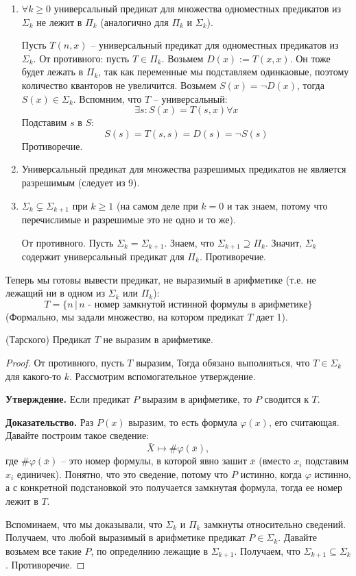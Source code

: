 \begin{enumerate}
    \item $\forall k \geqslant 0$ универсальный предикат для множества одноместных предикатов из $\Sigma_k$ не лежит в $\Pi_k$ (аналогично для $\Pi_k$ и $\Sigma_k$).
    
    Пусть $T(n, x)$ -- универсальный предикат для одноместных предикатов из $\Sigma_k$. От противного: пусть $T \in \Pi_k$. Возьмем $D(x) := T(x, x)$. Он тоже будет лежать в $\Pi_k$, так как переменные мы подставляем одинкаовые, поэтому количество кванторов не увеличится. Возьмем $S(x) = \lnot D(x)$, тогда $S(x) \in \Sigma_k$. Вспомним, что $T$ -- универсальный: \[ \exists s : S(x) = T(s, x) \forall x \]
    Подставим $s$ в $S$: \[ S(s) = T(s, s) = D(s) = \lnot S(s) \]
    Противоречие.

    \item Универсальный предикат для множества разрешимых предикатов не является разрешимым (следует из 9).
    \item $\Sigma_k \subsetneq \Sigma_{k+1}$ при $k \geqslant 1$ (на самом деле при $k = 0$ и так знаем, потому что перечислимые и разрешимые это не одно и то же).
    
    От противного. Пусть $\Sigma_k = \Sigma_{k+1}$. Знаем, что $\Sigma_{k+1} \supseteq \Pi_k$. Значит, $\Sigma_k$ содержит универсальный предикат для $\Pi_k$. Противоречие.
\end{enumerate}

Теперь мы готовы вывести предикат, не выразимый в арифметике (т.е. не лежащий ни в одном из $\Sigma_k$ или $\Pi_k$): \[ T = \{ n \,|\, \text{$n$ - номер замкнутой истинной формулы в арифметике} \} \] 
(Формально, мы задали множество, на котором предикат $T$ дает 1).

\vspace*{5mm}

\begin{theorem} (Тарского)
    Предикат $T$ не выразим в арифметике.
\end{theorem}
\begin{proof}
    От противного, пусть $T$ выразим, Тогда обязано выполняться, что $T \in \Sigma_k$ для какого-то $k$. Рассмотрим вспомогательное утверждение.

    \quad \textbf{Утверждение.} Если предикат $P$ выразим в арифметике, то $P$ сводится к $T$. 
    
    \quad \textbf{Доказательство.} Раз $P(x)$ выразим, то есть формула $\varphi(x)$, его считающая. Давайте 
    построим такое сведение: \[ \bar{X} \mapsto \#\varphi(\bar{x}), \] 
    где $\#\varphi(\bar{x})$ -- это номер формулы, в которой явно зашит $\bar{x}$ (вместо $x_i$ подставим $x_i$ единичек). Понятно, что это сведение, потому что $P$ истинно, когда $\varphi$ истинно, а с конкретной подстановкой это получается замкнутая формула, тогда ее номер лежит в $T$. 
    
    Вспоминаем, что мы доказывали, что $\Sigma_k$ и $\Pi_k$ замкнуты относительно сведений. Получаем, что любой выразимый в арифметике предикат $P \in \Sigma_k$. Давайте возьмем все такие $P$, по определнию лежащие в $\Sigma_{k+1}$. Получаем, что $\Sigma_{k+1} \subseteq \Sigma_k$. Противоречие.
\end{proof}

